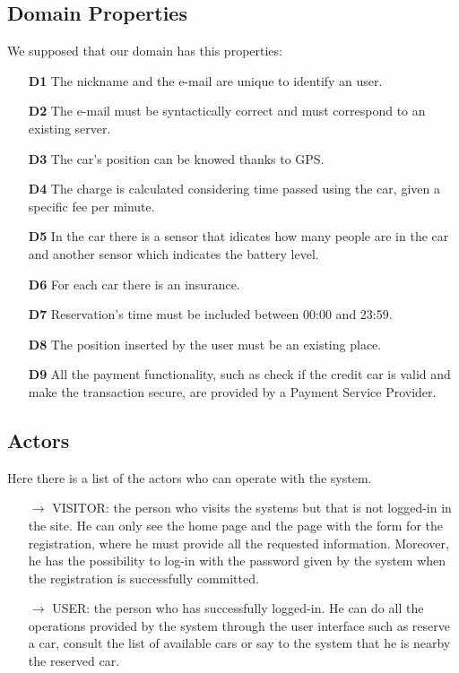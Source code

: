 \subsection{Domain Properties} \label{subsec:domain}
We supposed that our domain has this properties:
\begin{itemize}
\item[\textbf{D1}]The nickname and the e-mail are unique to identify an user.
\item[\textbf{D2}]The e-mail must be syntactically correct and must correspond to an existing server.
\item[\textbf{D3}]The car's position can be knowed thanks to GPS.
\item[\textbf{D4}]The charge is calculated considering time passed using the car, given a specific fee per minute.
\item[\textbf{D5}]In the car there is a sensor that idicates how many people %
 are in the car and another sensor which indicates the battery level.
\item[\textbf{D6}]For each car there is an insurance.
\item[\textbf{D7}]Reservation's time must be included between 00:00 and 23:59.
\item[\textbf{D8}]The position inserted by the user must be an existing place.
\item[\textbf{D9}]All the payment functionality, such as check if the credit car is valid and make the transaction secure, are provided by a Payment Service Provider.
\end{itemize}


\subsection{Actors} \label{subsec:actors}
Here there is a list of the actors who can operate with the system.
\begin{itemize}
\item[\textbf{$\rightarrow$}] VISITOR: the person who visits the systems but that is not logged-in in the site. He can only see the home page and the page with the form for the registration, where he must provide all the requested information. Moreover, he has the possibility to log-in with the password given by the system when the registration is successfully committed. 
\item[\textbf{$\rightarrow$}] USER: the person who has successfully logged-in. He can do all the operations provided by the system through the user interface such as reserve a car, consult the list of available cars or say to the system that he is nearby the reserved car. 
\end{itemize}

